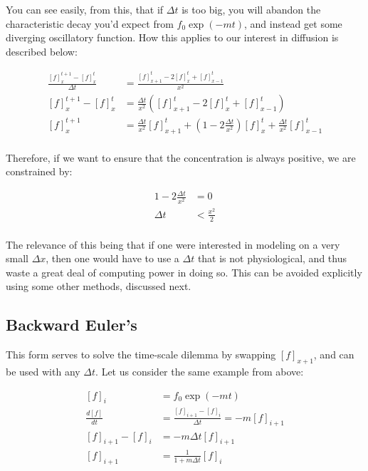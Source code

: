 \documentclass[12pt]{report}
\newcommand{\pr}[1]{\left(#1\right)}
\begin{document}
You can see easily, from this, that if $\Delta t$ is too big, you will abandon the characteristic decay you'd expect from $f_0\exp(-mt)$, and instead get some diverging oscillatory function. How this applies to our interest in diffusion is described below: 

\begin{equation} \label{eq8}
\begin{split}
\frac{[f]^{t+1}_{x} - [f]^{t}_{x}}{\Delta t} &= \frac{[f]^{t}_{x+1} - 2[f]^{t}_x + [f]^{t}_{x - 1}}{x^2}\\
[f]^{t+1}_{x} - [f]^{t}_{x} &= \frac{\Delta t}{x^2} \pr{[f]^{t}_{x+1} - 2[f]^{t}_x + [f]^{t}_{x - 1}} \\
[f]^{t+1}_{x} &= \frac{\Delta t}{x^2} [f]^{t}_{x+1} + \pr{1 - 2\frac{\Delta t}{x^2}}[f]^{t}_x + \frac{\Delta t}{x^2}[f]^{t}_{x - 1} \\
\end{split}
\end{equation}

Therefore, if we want to ensure that the concentration is always positive, we are constrained by: 

\begin{equation} \label{eq8}
\begin{split}
1 - 2\frac{\Delta t}{x^2} & = 0\\
\Delta t & < \frac{x^2}{2}\\
\end{split}
\end{equation}

The relevance of this being that if one were interested in modeling on a very small $\Delta x$, then one would have to use a $\Delta t$ that is not physiological, and thus waste a great deal of computing power in doing so. This can be avoided explicitly using some other methods, discussed next. 

\subsection{Backward Euler's} This form serves to solve the time-scale dilemma by swapping $[f]_{x+1}$, and can be used with any $\Delta t$. Let us consider the same example from above: 

\begin{equation} \label{eq8}
\begin{split}
[f]_i & = f_0\exp(-mt) \\
\frac{d[f]}{dt} & = \frac{[f]_{i+1} - [f]_{i}}{\Delta t} = -m[f]_{i+1} \\
[f]_{i+1} - [f]_{i} & = -m\Delta t[f]_{i+1} \\
[f]_{i+1} & = \frac{1}{1+m\Delta t}[f]_{i} \\
\end{split}
\end{equation}
\end{document}
